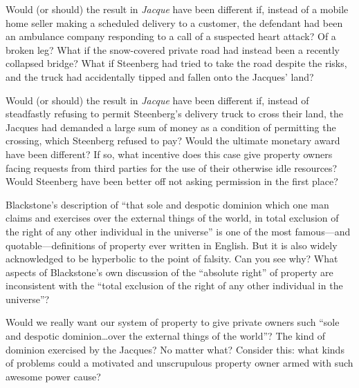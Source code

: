 
\item \label{bkm:Ref328040570}Would (or should) the result in \textit{Jacque}
have been different if, instead of a mobile home seller making a scheduled
delivery to a customer, the defendant had been an ambulance company responding
to a call of a suspected heart attack? Of a broken leg? What if the
snow-covered private road had instead been a recently collapsed bridge? What if
Steenberg had tried to take the road despite the risks, and the truck had
accidentally tipped and fallen onto the Jacques' land?

\item \label{bkm:Ref328040574}Would (or should) the result in \textit{Jacque}
have been different if, instead of steadfastly refusing to permit Steenberg's
delivery truck to cross their land, the Jacques had demanded a large sum of
money as a condition of permitting the crossing, which Steenberg refused to
pay? Would the ultimate monetary award have been different? If so, what
incentive does this case give property owners facing requests from third
parties for the use of their otherwise idle resources? Would Steenberg have
been better off not asking permission in the first place?

\item Blackstone's description of ``that sole and despotic dominion which one
man claims and exercises over the external things of the world, in total
exclusion of the right of any other individual in the universe'' is one of
the most famous---and quotable---definitions of property ever written in
English. But it is also widely acknowledged to be hyperbolic to the point of
falsity. Can you see why? What aspects of Blackstone's own discussion of the
``absolute right'' of property are inconsistent with the ``total exclusion of
the right of any other individual in the universe''?

\item Would we really want our system of property to give private owners such
``sole and despotic dominion\ldots over the external things of the world''? The
kind of dominion exercised by the Jacques? No matter what? Consider this: what
kinds of problems could a motivated and unscrupulous property owner armed with
such awesome power cause?


